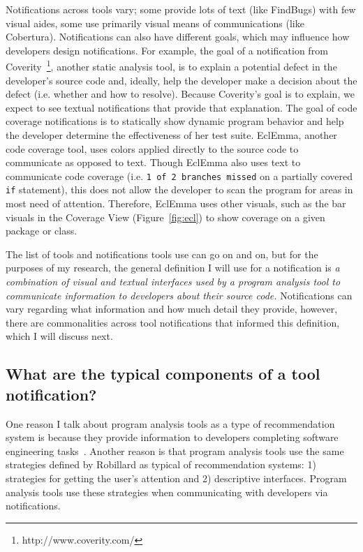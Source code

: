 \documentclass{llncs}
\begin{document}
Notifications across tools vary; some provide lots of text (like FindBugs) with few visual aides, some use primarily visual means of communications (like Cobertura). Notifications can also have different goals, which may influence how developers design notifications. For example, the goal of a notification from Coverity~\footnote{http://www.coverity.com/}, another static analysis tool, is to explain a potential defect in the developer's source code and, ideally, help the developer make a decision about the defect (i.e. whether and how to resolve). Because Coverity's goal is to explain, we expect to see textual notifications that provide that explanation.
The goal of code coverage notifications is to statically show dynamic program behavior and help the developer determine the effectiveness of her test suite. EclEmma, another code coverage tool, uses colors applied directly to the source code to communicate as opposed to text. Though EclEmma also uses text to communicate code coverage (i.e. \texttt{1 of 2 branches missed} on a partially covered \texttt{if} statement), this does not allow the developer to scan the program for areas in most need of attention. Therefore, EclEmma uses other visuals, such as the bar visuals in the Coverage View (Figure~\ref{fig:ecl}) to show coverage on a given package or class.

The list of tools and notifications tools use can go on and on, but for the purposes of my research, the general definition I will use for a notification is \emph{a combination of visual and textual interfaces used by a program analysis tool to communicate information to developers about their source code.} Notifications can vary regarding what information and how much detail they provide, however, there are commonalities across tool notifications that informed this definition, which I will discuss next.

\subsection{What are the typical components of a tool notification?}
One reason I talk about program analysis tools as a type of recommendation system is because they provide information to developers completing software engineering tasks~\cite{robillard2014recommendation}. 
Another reason is that program analysis tools use the same strategies defined by Robillard as typical of recommendation systems: 1) strategies for getting the user's attention and 2) descriptive interfaces.
Program analysis tools use these strategies when communicating with developers via notifications.
\end{document}
